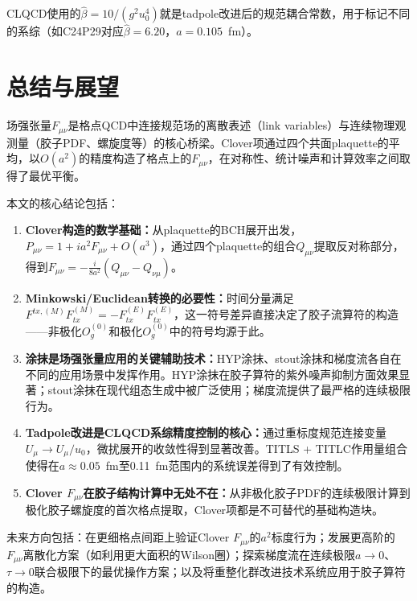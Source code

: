 \documentclass[12pt,a4paper]{ctexart}
\theoremstyle{definition}
\begin{document}
CLQCD使用的$\hat{\beta} = 10/(g^2 u_0^4)$就是tadpole改进后的规范耦合常数\cite{CLQCD2025}，用于标记不同的系综（如C24P29对应$\hat{\beta}=6.20$，$a=0.105$~fm）。

\section{总结与展望}

场强张量$F_{\mu\nu}$是格点QCD中连接规范场的离散表述（link variables）与连续物理观测量（胶子PDF、螺旋度等）的核心桥梁。Clover项通过四个共面plaquette的平均，以$O(a^2)$的精度构造了格点上的$F_{\mu\nu}$，在对称性、统计噪声和计算效率之间取得了最优平衡。

本文的核心结论包括：

\begin{enumerate}
    \item \textbf{Clover构造的数学基础：}从plaquette的BCH展开出发，$P_{\mu\nu} = 1 + ia^2F_{\mu\nu} + O(a^3)$，通过四个plaquette的组合$Q_{\mu\nu}$提取反对称部分，得到$F_{\mu\nu} = -\frac{i}{8a^2}(Q_{\mu\nu} - Q_{\nu\mu})$。

    \item \textbf{Minkowski/Euclidean转换的必要性：}时间分量满足$F^{tx,(M)}F^{(M)}_{tx} = -F^{(E)}_{tx}F^{(E)}_{tx}$，这一符号差异直接决定了胶子流算符的构造——非极化$O^{(0)}_g$和极化$O^{(0)}_g$中的符号均源于此。

    \item \textbf{涂抹是场强张量应用的关键辅助技术：}HYP涂抹、stout涂抹和梯度流各自在不同的应用场景中发挥作用。HYP涂抹在胶子算符的紫外噪声抑制方面效果显著；stout涂抹在现代组态生成中被广泛使用；梯度流提供了最严格的连续极限行为。

    \item \textbf{Tadpole改进是CLQCD系综精度控制的核心：}通过重标度规范连接变量$U_\mu \to U_\mu/u_0$，微扰展开的收敛性得到显著改善。TITLS + TITLC作用量组合使得在$a \approx 0.05$~fm至0.11~fm范围内的系统误差得到了有效控制。

    \item \textbf{Clover $F_{\mu\nu}$在胶子结构计算中无处不在：}从非极化胶子PDF的连续极限计算到极化胶子螺旋度的首次格点提取，Clover项都是不可替代的基础构造块。
\end{enumerate}

未来方向包括：在更细格点间距上验证Clover $F_{\mu\nu}$的$a^2$标度行为；发展更高阶的$F_{\mu\nu}$离散化方案（如利用更大面积的Wilson圈）；探索梯度流在连续极限$a \to 0$、$\tau \to 0$联合极限下的最优操作方案；以及将重整化群改进技术系统应用于胶子算符的构造。
\end{document}
